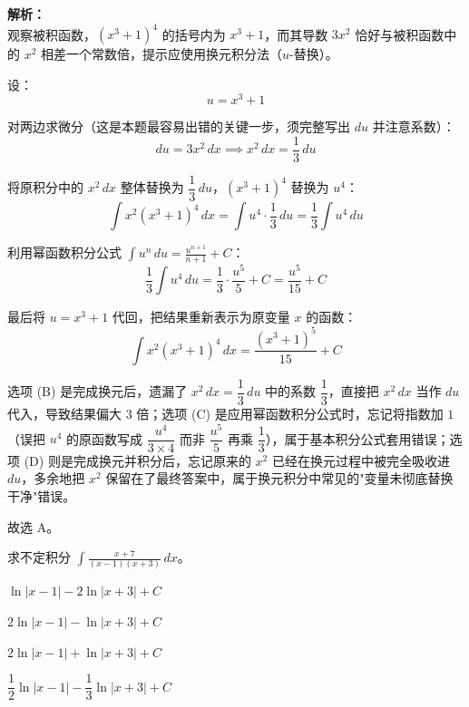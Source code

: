 \documentclass[12pt,a4paper]{exam-zh}
\begin{document}
\begin{solution}
    \textbf{解析：} \\
    观察被积函数，$(x^3+1)^4$ 的括号内为 $x^3+1$，而其导数 $3x^2$ 恰好与被积函数中的 $x^2$ 相差一个常数倍，提示应使用换元积分法（$u$-替换）。

    设：
    \[ \displaystyle u = x^3 + 1 \]

    对两边求微分（这是本题最容易出错的关键一步，须完整写出 $du$ 并注意系数）：
    \[ \displaystyle du = 3x^2\,dx \implies x^2\,dx = \frac{1}{3}\,du \]

    将原积分中的 $x^2\,dx$ 整体替换为 $\dfrac13\,du$，$(x^3+1)^4$ 替换为 $u^4$：
    \[ \displaystyle \int x^2(x^3+1)^4\,dx = \int u^4 \cdot \frac{1}{3}\,du = \frac{1}{3}\int u^4\,du \]

    利用幂函数积分公式 $\displaystyle\int u^n\,du = \frac{u^{n+1}}{n+1}+C$：
    \[ \displaystyle \frac{1}{3}\int u^4\,du = \frac{1}{3}\cdot\frac{u^5}{5} + C = \frac{u^5}{15} + C \]

    最后将 $u=x^3+1$ 代回，把结果重新表示为原变量 $x$ 的函数：
    \[ \displaystyle \int x^2(x^3+1)^4\,dx = \frac{(x^3+1)^5}{15} + C \]

    选项 (B) 是完成换元后，遗漏了 $x^2\,dx=\dfrac13\,du$ 中的系数 $\dfrac13$，直接把 $x^2\,dx$ 当作 $du$ 代入，导致结果偏大 $3$ 倍；选项 (C) 是应用幂函数积分公式时，忘记将指数加 $1$（误把 $u^4$ 的原函数写成 $\dfrac{u^4}{3\times4}$ 而非 $\dfrac{u^5}{5}$ 再乘 $\dfrac13$），属于基本积分公式套用错误；选项 (D) 则是完成换元并积分后，忘记原来的 $x^2$ 已经在换元过程中被完全吸收进 $du$，多余地把 $x^2$ 保留在了最终答案中，属于换元积分中常见的"变量未彻底替换干净"错误。

    故选 A。
\end{solution}

\begin{question}
    求不定积分 $\displaystyle\int \frac{x+7}{(x-1)(x+3)}\,dx$。\paren[B]
    \begin{choices}
        \item $\ln|x-1| - 2\ln|x+3| + C$
        \item $2\ln|x-1| - \ln|x+3| + C$
        \item $2\ln|x-1| + \ln|x+3| + C$
        \item $\dfrac{1}{2}\ln|x-1| - \dfrac{1}{3}\ln|x+3| + C$
    \end{choices}
\end{question}
\end{document}
